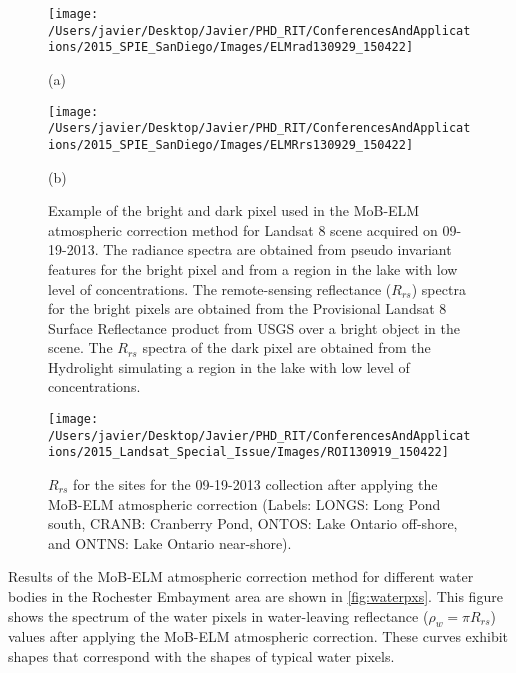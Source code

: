 \begin{figure}[H]
  \begin{minipage}[c]{0.48\linewidth}
    \centering
      \texttt{[image: /Users/javier/Desktop/Javier/PHD\_RIT/ConferencesAndApplications/2015\_SPIE\_SanDiego/Images/ELMrad130929\_150422]}
    \centerline{(a)}\medskip
  \end{minipage}
  \hfill
  \begin{minipage}[d]{0.48\linewidth}
    \centering
      \texttt{[image: /Users/javier/Desktop/Javier/PHD\_RIT/ConferencesAndApplications/2015\_SPIE\_SanDiego/Images/ELMRrs130929\_150422]}
    \centerline{(b)}\medskip
  \end{minipage}
  \caption[Example of the bright and dark pixel used in the MoB-ELM atmospheric correction method for Landsat 8 scene acquired on 09-19-2013.]{Example of the bright and dark pixel used in the MoB-ELM atmospheric correction method for Landsat 8 scene acquired on 09-19-2013. The radiance spectra are obtained from pseudo invariant features for the bright pixel and from a region in the lake with low level of concentrations. The remote-sensing reflectance ($R_{rs}$) spectra for the bright pixels are obtained from the Provisional Landsat 8 Surface Reflectance product from USGS over a bright object in the scene. The $R_{rs}$ spectra of the dark pixel are obtained from the Hydrolight simulating a region in the lake with low level of concentrations.\label{fig:MOBELMpxls} } 
\end{figure}

\begin{figure}[htbp!]
  \centering
  \texttt{[image: /Users/javier/Desktop/Javier/PHD\_RIT/ConferencesAndApplications/2015\_Landsat\_Special\_Issue/Images/ROI130919\_150422]}

  \caption[$R_{rs}$ for the sites for the 09-19-2013 collection after applying the MoB-ELM atmospheric correction.]{$R_{rs}$ for the sites for the 09-19-2013 collection after applying the MoB-ELM atmospheric correction (Labels: LONGS: Long Pond south, CRANB: Cranberry Pond, ONTOS: Lake Ontario off-shore, and ONTNS: Lake Ontario near-shore). \label{fig:RrsROIs_130919}} 
\end{figure}

Results of the MoB-ELM atmospheric correction method for different water bodies in the Rochester Embayment area are shown in \autoref{fig:waterpxs}. This figure shows the spectrum of the water pixels in water-leaving reflectance ($\rho_w=\pi R_{rs}$) values after applying the MoB-ELM atmospheric correction. These curves exhibit shapes that correspond with the shapes of typical water pixels. 

